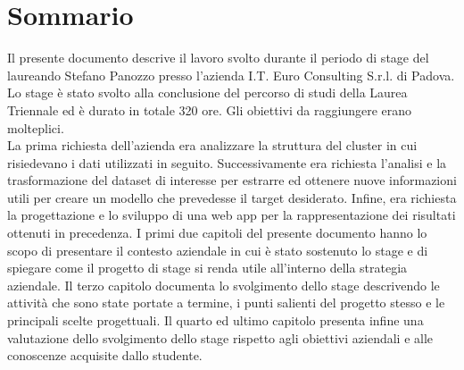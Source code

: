 
\cleardoublepage
{}
{}
\begingroup
\let\clearpage\relax
\let\cleardoublepage\relax
\let\cleardoublepage\relax

\chapter*{Sommario}

Il presente documento descrive il lavoro svolto durante il periodo di stage del laureando Stefano Panozzo presso l'azienda I.T. Euro Consulting S.r.l. di Padova. Lo stage è stato svolto alla conclusione del percorso di studi della Laurea Triennale ed è durato in totale 320 ore.
Gli obiettivi da raggiungere erano molteplici.\\
La prima richiesta dell'azienda era analizzare la struttura del \gls{cluster} in cui risiedevano i dati utilizzati in seguito. 
Successivamente era richiesta l'analisi e la trasformazione del dataset di interesse per estrarre ed ottenere nuove informazioni utili per creare un modello che prevedesse il target desiderato. 
Infine, era richiesta la progettazione e lo sviluppo di una \gls{web app} per la rappresentazione dei risultati ottenuti in precedenza.
I primi due capitoli del presente documento hanno lo scopo di presentare il contesto aziendale in cui è stato sostenuto lo stage e di spiegare come il progetto di stage si renda utile all’interno della strategia aziendale. Il terzo capitolo documenta lo svolgimento dello stage descrivendo le attività che sono state portate a termine, i punti salienti del progetto stesso e le principali scelte progettuali. Il quarto ed ultimo capitolo presenta infine una valutazione dello svolgimento dello stage rispetto agli obiettivi aziendali e alle conoscenze acquisite dallo studente.

%
%

\endgroup			

\vfill

